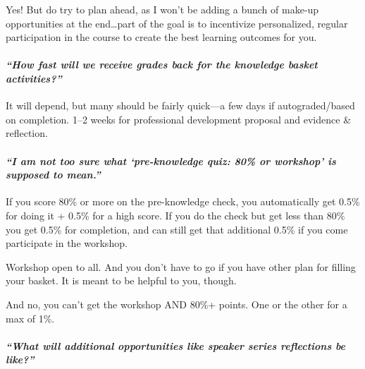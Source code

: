 \documentclass[
  openany]{book}
\begin{document}
Yes! But do try to plan ahead, as I won't be adding a bunch of make-up opportunities at the end\ldots part of the goal is to incentivize personalized, regular participation in the course to create the best learning outcomes for you.

\hypertarget{how-fast-will-we-receive-grades-back-for-the-knowledge-basket-activities}{%
\paragraph{\texorpdfstring{\emph{``How fast will we receive grades back for the knowledge basket activities?''}}{``How fast will we receive grades back for the knowledge basket activities?''}}\label{how-fast-will-we-receive-grades-back-for-the-knowledge-basket-activities}}

It will depend, but many should be fairly quick---a few days if autograded/based on completion. 1--2 weeks for professional development proposal and evidence \& reflection.

\hypertarget{i-am-not-too-sure-what-pre-knowledge-quiz-80-or-workshop-is-supposed-to-mean.}{%
\paragraph{\texorpdfstring{\emph{``I am not too sure what `pre-knowledge quiz: 80\% or workshop' is supposed to mean.''}}{``I am not too sure what `pre-knowledge quiz: 80\% or workshop' is supposed to mean.''}}\label{i-am-not-too-sure-what-pre-knowledge-quiz-80-or-workshop-is-supposed-to-mean.}}

If you score 80\% or more on the pre-knowledge check, you automatically get 0.5\% for doing it + 0.5\% for a high score. If you do the check but get less than 80\% you get 0.5\% for completion, and can still get that additional 0.5\% if you come participate in the workshop.

Workshop open to all. And you don't have to go if you have other plan for filling your basket. It is meant to be helpful to you, though.

And no, you can't get the workshop AND 80\%+ points. One or the other for a max of 1\%.

\hypertarget{what-will-additional-opportunities-like-speaker-series-reflections-be-like}{%
\paragraph{\texorpdfstring{\emph{``What will additional opportunities like speaker series reflections be like?''}}{``What will additional opportunities like speaker series reflections be like?''}}\label{what-will-additional-opportunities-like-speaker-series-reflections-be-like}}
\end{document}

